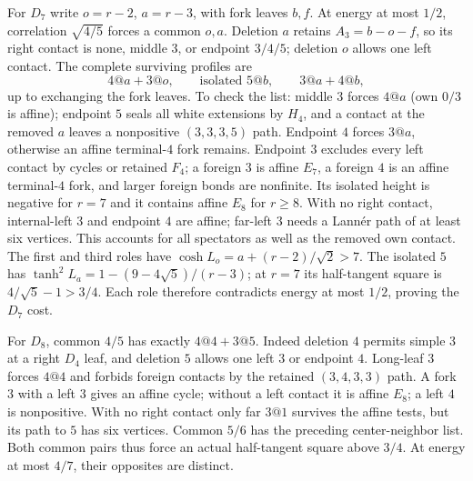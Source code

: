 \documentclass[11pt]{article}
\theoremstyle{definition}
\theoremstyle{remark}
\begin{document}
For $D_7$ write $o=r-2$, $a=r-3$, with fork leaves $b,f$.
At energy at most $1/2$, correlation $\sqrt{4/5}$ forces a
common $o,a$. Deletion $a$ retains $A_3=b-o-f$, so its right
contact is none, middle $3$, or endpoint $3/4/5$; deletion $o$
allows one left contact. The complete surviving profiles are
\begin{equation}\label{app:eq:D7roles}
 4@a+3@o,\qquad\text{isolated }5@b,\qquad3@a+4@b,
\end{equation}
up to exchanging the fork leaves. To check the list: middle $3$
forces $4@a$ (own $0/3$ is affine); endpoint $5$ seals all white
extensions by $H_4$, and a contact at the removed $a$ leaves a
nonpositive $(3,3,3,5)$ path. Endpoint $4$ forces $3@a$, otherwise
an affine terminal-$4$ fork remains. Endpoint $3$ excludes every
left contact by cycles or retained $F_4$; a foreign $3$ is affine
$E_7$, a foreign $4$ is an affine terminal-$4$ fork, and larger
foreign bonds are nonfinite. Its isolated height is negative for
$r=7$ and it contains affine $E_8$ for $r\ge8$.
With no right contact, internal-left $3$ and endpoint $4$ are
affine; far-left $3$ needs a Lann\'er path of at least six vertices.
This accounts for all spectators as well as the removed own contact.
The first and third roles have
$\cosh L_o=a+(r-2)/\sqrt2>7$.
The isolated $5$ has
$\tanh^2L_a=1-(9-4\sqrt5)/(r-3)$; at $r=7$ its half-tangent
square is $4/\sqrt5-1>3/4$. Each role therefore contradicts
energy at most $1/2$, proving the $D_7$ cost.

For $D_8$, common $4/5$ has exactly $4@4+3@5$.
Indeed deletion $4$ permits simple $3$ at a right $D_4$ leaf,
and deletion $5$ allows one left $3$ or endpoint $4$.
Long-leaf $3$ forces $4@4$ and forbids foreign contacts by the
retained $(3,4,3,3)$ path. A fork $3$ with a left $3$ gives an
affine cycle; without a left contact it is affine $E_8$; a left
$4$ is nonpositive. With no right contact only far $3@1$ survives
the affine tests, but its path to $5$ has six vertices.
Common $5/6$ has the preceding center-neighbor list. Both common
pairs thus force an actual half-tangent square above $3/4$.
At energy at most $4/7$, their opposites are distinct.
\end{document}

